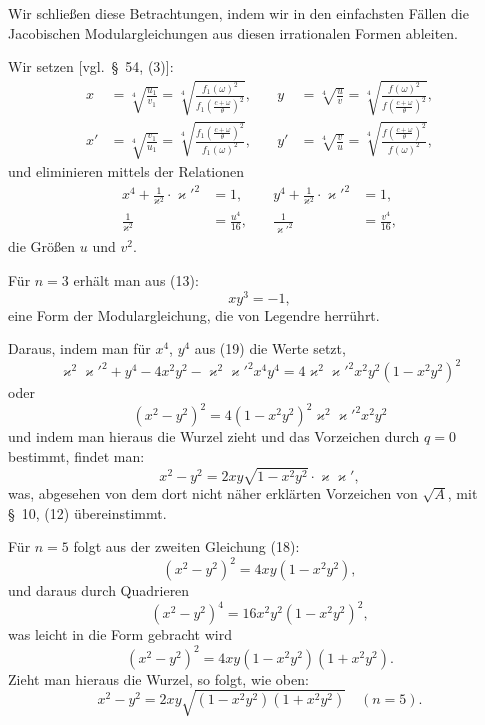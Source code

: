\documentclass[12pt,a4paper]{article}
\theoremstyle{definition}
\begin{document}
Wir schließen diese Betrachtungen, indem wir in den einfachsten Fällen die Jacobischen Modulargleichungen aus diesen irrationalen Formen ableiten.

Wir setzen [vgl.\ \S\ 54, (3)]:
\[
\begin{aligned}
x &= \sqrt[4]{\frac{u_1}{v_1}} = \sqrt[4]{\frac{f_1(\omega)^2}{f_1(\frac{c+\omega}{\theta})^2}}, &\quad y &= \sqrt[4]{\frac{u}{v}} = \sqrt[4]{\frac{f(\omega)^2}{f(\frac{c+\omega}{\theta})^2}}, \\
x' &= \sqrt[4]{\frac{v_1}{u_1}} = \sqrt[4]{\frac{f_1(\frac{c+\omega}{\theta})^2}{f_1(\omega)^2}}, &\quad y' &= \sqrt[4]{\frac{v}{u}} = \sqrt[4]{\frac{f(\frac{c+\omega}{\theta})^2}{f(\omega)^2}},
\end{aligned}
\]
und eliminieren mittels der Relationen
\begin{equation}\label{eq:75-19}
\begin{aligned}
x^4 + \frac{1}{\varkappa^2} \cdot \varkappa'^2 &= 1, &\quad y^4 + \frac{1}{\varkappa^2} \cdot \varkappa'^2 &= 1, \\
\frac{1}{\varkappa^2} &= \frac{u^4}{16}, &\quad \frac{1}{\varkappa'^2} &= \frac{v^4}{16},
\end{aligned}
\end{equation}
die Größen $u$ und $v^2$.

Für $n = 3$ erhält man aus (13):
\begin{equation}\label{eq:75-20}
xy^3 = -1,
\end{equation}
eine Form der Modulargleichung, die von Legendre herrührt.

Daraus, indem man für $x^4$, $y^4$ aus (19) die Werte setzt,
\[
\varkappa^2 \varkappa'^2 + y^4 - 4x^2 y^2 - \varkappa^2 \varkappa'^2 x^4 y^4 = 4\varkappa^2 \varkappa'^2 x^2 y^2 (1 - x^2 y^2)^2
\]
oder
\[
(x^2 - y^2)^2 = 4(1 - x^2 y^2)^2 \varkappa^2 \varkappa'^2 x^2 y^2
\]
und indem man hieraus die Wurzel zieht und das Vorzeichen durch $q = 0$ bestimmt, findet man:
\begin{equation}\label{eq:75-21}
x^2 - y^2 = 2xy \sqrt{1 - x^2 y^2} \cdot \varkappa \varkappa',
\end{equation}
was, abgesehen von dem dort nicht näher erklärten Vorzeichen von $\sqrt{A}$, mit \S\ 10, (12) übereinstimmt.

Für $n = 5$ folgt aus der zweiten Gleichung (18):
\[
(x^2 - y^2)^2 = 4xy(1 - x^2 y^2),
\]
und daraus durch Quadrieren
\[
(x^2 - y^2)^4 = 16x^2 y^2 (1 - x^2 y^2)^2,
\]
was leicht in die Form gebracht wird
\[
(x^2 - y^2)^2 = 4xy(1 - x^2 y^2)(1 + x^2 y^2).
\]
Zieht man hieraus die Wurzel, so folgt, wie oben:
\begin{equation}\label{eq:75-22}
x^2 - y^2 = 2xy \sqrt{(1 - x^2 y^2)(1 + x^2 y^2)} \quad (n = 5).
\end{equation}
\end{document}
